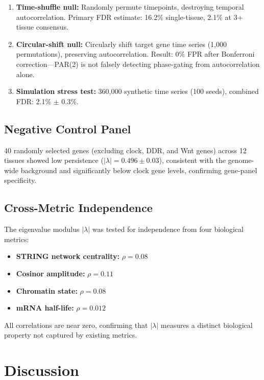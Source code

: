 \documentclass[11pt,letterpaper]{article}
\begin{document}
\begin{enumerate}
\item \textbf{Time-shuffle null:} Randomly permute timepoints, destroying temporal autocorrelation. Primary FDR estimate: 16.2\% single-tissue, 2.1\% at 3+ tissue consensus.
\item \textbf{Circular-shift null:} Circularly shift target gene time series (1,000 permutations), preserving autocorrelation. Result: 0\% FPR after Bonferroni correction---PAR(2) is not falsely detecting phase-gating from autocorrelation alone.
\item \textbf{Simulation stress test:} 360,000 synthetic time series (100 seeds), combined FDR: 2.1\% $\pm$ 0.3\%.
\end{enumerate}

\subsection{Negative Control Panel}

40 randomly selected genes (excluding clock, DDR, and Wnt genes) across 12 tissues showed low persistence ($|\lambda| = 0.496 \pm 0.03$), consistent with the genome-wide background and significantly below clock gene levels, confirming gene-panel specificity.

\subsection{Cross-Metric Independence}

The eigenvalue modulus $|\lambda|$ was tested for independence from four biological metrics:

\begin{itemize}
\item \textbf{STRING network centrality:} $\rho = 0.08$
\item \textbf{Cosinor amplitude:} $\rho = 0.11$
\item \textbf{Chromatin state:} $\rho = 0.08$
\item \textbf{mRNA half-life:} $\rho = 0.012$
\end{itemize}

All correlations are near zero, confirming that $|\lambda|$ measures a distinct biological property not captured by existing metrics.


\section{Discussion}
\end{document}
